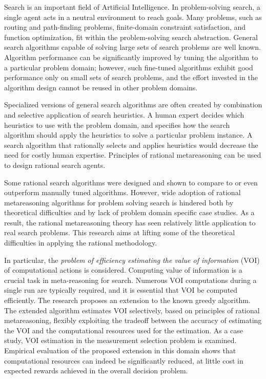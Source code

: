 Search is an important field of Artificial Intelligence.
In problem-solving search, a single agent acts
in a neutral environment to reach goals. Many problems, such as
routing and path-finding problems, finite-domain constraint
satisfaction, and function optimization, fit within the problem-solving
search abstraction. General search algorithms capable of solving large
sets of search problems are well known. Algorithm performance can be
significantly improved by tuning the algorithm to a particular problem
domain; however, such fine-tuned algorithms exhibit good performance
only on small sets of search problems, and the effort invested in the
algorithm design cannot be reused in other problem domains.

Specialized versions of general search algorithms are often created by
combination and selective application of search  heuristics.
A human expert decides which heuristics to use with the
problem domain, and specifies how the search algorithm should apply
the heuristics to solve a particular problem instance. A search
algorithm that rationally selects and applies heuristics would decrease
the need for costly human expertise. Principles of rational
metareasoning can be used to design rational search agents.  

Some rational search algorithms were designed and shown to compare to
or even outperform manually tuned algorithms. However, wide adoption
of rational metareasoning algorithms for problem solving search is
hindered both by theoretical difficulties and by lack of problem
domain specific case studies. As a result, the rational metareasoning
theory has seen relatively little application to real search
problems. This research aims at lifting some of the theoretical
difficulties in applying the rational methodology. 

In particular, the \emph{problem of efficiency estimating the value of
information} (VOI) of computational actions is considered. Computing value of
information is a crucial task in meta-reasoning for search. Numerous
VOI computations during a single run are typically required, and it is
essential that VOI be computed efficiently. The research proposes
an extension to the known greedy algorithm. The extended algorithm
estimates VOI selectively, based on principles of rational
metareasoning, flexibly exploiting the tradeoff between the
accuracy of estimating the VOI and the computational resources used for the
estimation. As a case study, VOI estimation in the measurement selection
problem is examined.  Empirical evaluation of the proposed extension in this
domain shows that computational resources can indeed be significantly
reduced, at little cost in expected rewards achieved in the overall
decision problem.

